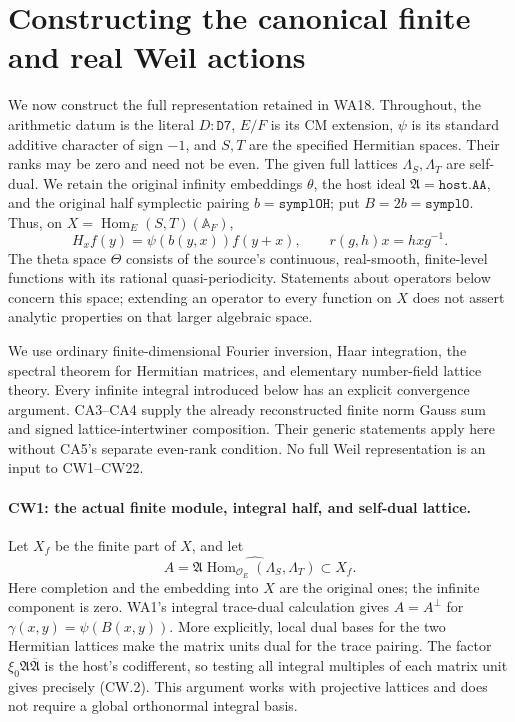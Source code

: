 \section{Constructing the canonical finite and real Weil actions}
\label{sec:canonical-weil}

We now construct the full representation retained in WA18.  Throughout,
the arithmetic datum is the literal $D:\texttt{D7}$, $E/F$ is its CM
extension, $\psi$ is its standard additive character of sign $-1$, and
$S,T$ are the specified Hermitian spaces.  Their ranks may be zero and
need not be even.  The given full lattices $\Lambda_S,\Lambda_T$ are
self-dual.  We retain the original infinity embeddings $\theta$, the
host ideal $\mathfrak A=\texttt{host.AA}$, and the original half
symplectic pairing $b=\texttt{symplOH}$; put $B=2b=\texttt{symplO}$.
Thus, on $X=\operatorname{Hom}_E(S,T)(\mathbb A_F)$,
\[
 H_xf(y)=\psi(b(y,x))f(y+x),\qquad
 r(g,h)x=hxg^{-1}.                                      \tag{CW.1}
\]
The theta space $\Theta$ consists of the source's continuous,
real-smooth, finite-level functions with its rational quasi-periodicity.
Statements about operators below concern this space; extending an
operator to every function on $X$ does not assert analytic properties
on that larger algebraic space.

We use ordinary finite-dimensional Fourier inversion, Haar integration,
the spectral theorem for Hermitian matrices, and elementary number-field
lattice theory.  Every infinite integral introduced below has an
explicit convergence argument.  CA3--CA4 supply the already reconstructed
finite norm Gauss sum and signed lattice-intertwiner composition.  Their
generic statements apply here without CA5's separate even-rank condition.
No full Weil representation is an input to CW1--CW22.

\paragraph{CW1: the actual finite module, integral half, and self-dual lattice.}
Let $X_f$ be the finite part of $X$, and let
\[
 A=\widehat{\mathfrak A\operatorname{Hom}_{\mathcal O_E}
                  (\Lambda_S,\Lambda_T)}\subset X_f .     \tag{CW.2}
\]
Here completion and the embedding into $X$ are the original ones; the
infinite component is zero.  WA1's integral trace-dual calculation gives
$A=A^{\perp}$ for $\gamma(x,y)=\psi(B(x,y))$.  More explicitly, local
dual bases for the two Hermitian lattices make the matrix units dual
for the trace pairing.  The factor
$\xi_0\mathfrak A\overline{\mathfrak A}$ is the host's codifferent,
so testing all integral multiples of each matrix unit gives precisely
(CW.2).  This argument works with projective lattices and does not
require a global orthonormal integral basis.

